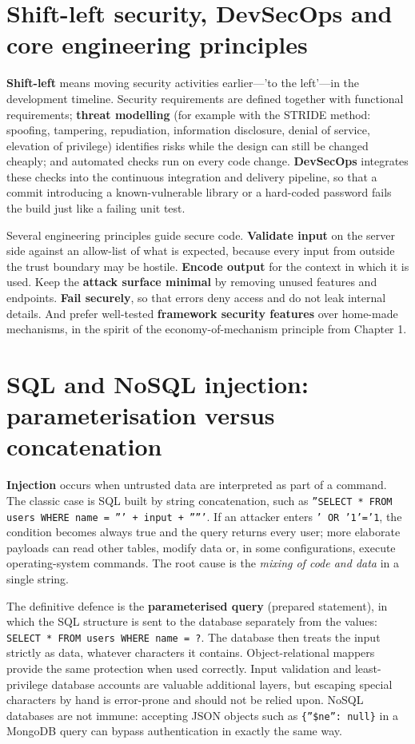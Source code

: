 \documentclass[11pt,openany]{book}
\begin{document}
\section{Shift-left security, DevSecOps and core engineering principles}\label{sec:9.1}
\textbf{Shift-left} means moving security activities earlier—'to the left'—in the development timeline. Security requirements are defined together with functional requirements; \textbf{threat modelling} (for example with the STRIDE method: spoofing, tampering, repudiation, information disclosure, denial of service, elevation of privilege) identifies risks while the design can still be changed cheaply; and automated checks run on every code change. \textbf{DevSecOps} integrates these checks into the continuous integration and delivery pipeline, so that a commit introducing a known-vulnerable library or a hard-coded password fails the build just like a failing unit test.

Several engineering principles guide secure code. \textbf{Validate input} on the server side against an allow-list of what is expected, because every input from outside the trust boundary may be hostile. \textbf{Encode output} for the context in which it is used. Keep the \textbf{attack surface minimal} by removing unused features and endpoints. \textbf{Fail securely}, so that errors deny access and do not leak internal details. And prefer well-tested \textbf{framework security features} over home-made mechanisms, in the spirit of the economy-of-mechanism principle from Chapter 1.

\section{SQL and NoSQL injection: parameterisation versus concatenation}\label{sec:9.2}
\textbf{Injection} occurs when untrusted data are interpreted as part of a command. The classic case is SQL built by string concatenation, such as \texttt{''SELECT * FROM users WHERE name = ''' + input + '''''}. If an attacker enters \texttt{' OR '1'='1}, the condition becomes always true and the query returns every user; more elaborate payloads can read other tables, modify data or, in some configurations, execute operating-system commands. The root cause is the \emph{mixing of code and data} in a single string.

The definitive defence is the \textbf{parameterised query} (prepared statement), in which the SQL structure is sent to the database separately from the values: \texttt{SELECT * FROM users WHERE name = ?}. The database then treats the input strictly as data, whatever characters it contains. Object-relational mappers provide the same protection when used correctly. Input validation and least-privilege database accounts are valuable additional layers, but escaping special characters by hand is error-prone and should not be relied upon. NoSQL databases are not immune: accepting JSON objects such as \texttt{\{''\$ne'': null\}} in a MongoDB query can bypass authentication in exactly the same way.
\end{document}
